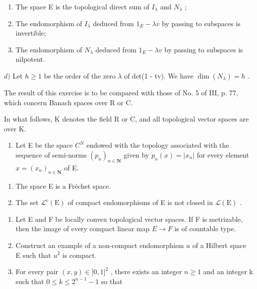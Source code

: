 \begin{enumerate}
\def\labelenumi{(\roman{enumi})}
\item
  The space E is the topological direct sum of \(I_{\lambda}\) and \(N_{\lambda}\) ;
\item
  The endomorphism of \(I_{\lambda}\) deduced from \(1_{E} - \lambda v\) by passing to subspaces is invertible;
\item
  The endomorphism of \(N_{\lambda}\) deduced from \(1_{E} - \lambda v\) by passing to subspaces is nilpotent.
\end{enumerate}

\(d)\) Let \(h \geqslant 1\) be the order of the zero \(\lambda\) of det(1 - tv). We have \(\dim(N_{\lambda}) = h\) .

The result of this exercise is to be compared with those of No. 5 of III, p. 77, which concern Banach spaces over R or C.

In what follows, K denotes the field R or C, and all topological vector spaces are over K.

\begin{enumerate}
\def\labelenumi{\arabic{enumi})}
\setcounter{enumi}{5}
\tightlist
\item
  Let E be the space \(C^{N}\) endowed with the topology associated with the sequence of semi-norms \((p_{n})_{n\in\mathbf{N}}\) given by \(p_{n}(x)=|x_{n}|\) for every element \(x=(x_{n})_{n\in\mathbf{N}}\) of E.
\end{enumerate}

\begin{enumerate}
\def\labelenumi{\alph{enumi})}
\item
  The space E is a Fréchet space.
\item
  The set \(\mathcal{L}^{\mathrm{c}}(\mathrm{E})\) of compact endomorphisms of E is not closed in \(\mathcal{L}(\mathrm{E})\) .
\end{enumerate}

\begin{enumerate}
\def\labelenumi{\arabic{enumi})}
\setcounter{enumi}{6}
\item
  Let E and F be locally convex topological vector spaces. If F is metrizable, then the image of every compact linear map \(E \rightarrow F\) is of countable type.
\item
  Construct an example of a non-compact endomorphism \(u\) of a Hilbert space E such that \(u^2\) is compact.
\item
  For every pair \((x,y)\in]0,1]^{2}\) , there exists an integer \(n\geqslant1\) and an integer k such that \(0\leqslant k\leqslant2^{n-1}-1\) so that
\end{enumerate}

